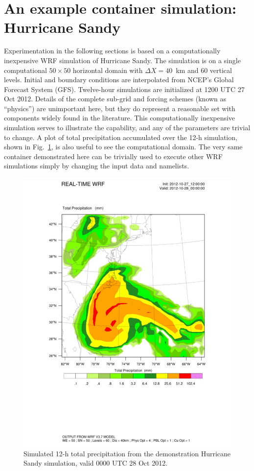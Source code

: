 \documentclass[final]{ametsoc}
\begin{document}
\section{An example container simulation: Hurricane Sandy}\label{sec:Sandy}

Experimentation in the following sections is based on a computationally inexpensive WRF simulation of Hurricane Sandy.  The simulation is on a single computational $50\times50$ horizontal domain with $\Delta X=40$~km and 60 vertical levels. Initial and boundary conditions are interpolated from NCEP's Global Forecast System (GFS). Twelve-hour simulations are initialized at 1200 UTC 27 Oct 2012.  Details of the complete sub-grid and forcing schemes (known as ``physics'') are unimportant here, but they do represent a reasonable set with components widely found in the literature. This computationally inexpensive simulation serves to illustrate the capability, and any of the parameters are trivial to change. A plot of total precipitation accumulated over the 12-h simulation, shown in Fig.~\ref{Fig:Sandy}, is also useful to see the computational domain. The very same container demonstrated here can be trivially used to execute other WRF simulations simply by changing the input data and namelists.

\begin{figure}
\begin{center}
\includegraphics[clip,viewport=60 180 600 690,scale=.3]{figures/Fig02.pdf}
\caption{\label{Fig:Sandy} Simulated 12-h total precipitation from the demonstration Hurricane Sandy simulation, valid 0000 UTC 28 Oct 2012.}
\end{center}
\end{figure}
\end{document}
